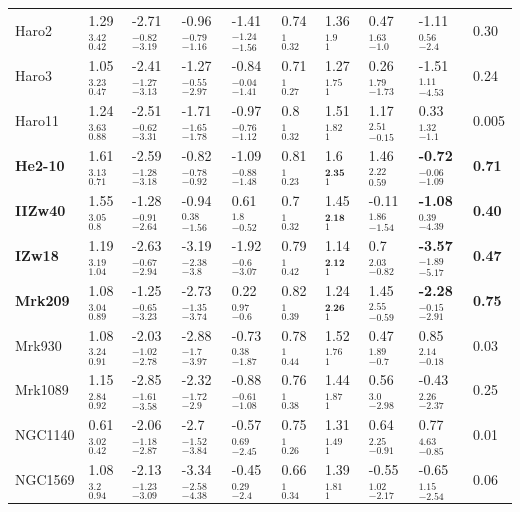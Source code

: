 \documentclass{aa}
\begin{document}
\begin{appendix}
\begin{table}[h!]
\begin{threeparttable}
\begin{tabular}{|p{}|p{}p{}p{}p{}|p{}p{}p{}p{}|p{}|}
\hline 
Haro2&1.29$_{0.42}^{3.42}$&-2.71$_{-3.19}^{-0.82}$&-0.96$_{-1.16}^{-0.79}$&-1.41$_{-1.56}^{-1.24}$&0.74$_{0.32}^{1}$&1.36$_{1}^{1.9}$&0.47$_{-1.0}^{1.63}$&-1.11$_{-2.4}^{0.56}$&0.30 \\
Haro3&1.05$_{0.47}^{3.23}$&-2.41$_{-3.13}^{-1.27}$&-1.27$_{-2.97}^{-0.55}$&-0.84$_{-1.41}^{-0.04}$&0.71$_{0.27}^{1}$&1.27$_{1}^{1.75}$&0.26$_{-1.73}^{1.79}$&-1.51$_{-4.53}^{1.11}$& 0.24\\
Haro11&1.24$_{0.88}^{3.63}$&-2.51$_{-3.31}^{-0.62}$&-1.71$_{-1.78}^{-1.65}$&-0.97$_{-1.12}^{-0.76}$&0.8$_{0.32}^{1}$&1.51$_{1}^{1.82}$&1.17$_{-0.15}^{2.51}$&0.33$_{-1.1}^{1.32}$&0.005\\
\textbf{He2-10}&1.61$_{0.71}^{3.13}$&-2.59$_{-3.18}^{-1.28}$&-0.82$_{-0.92}^{-0.78}$&-1.09$_{-1.48}^{-0.88}$&0.81$_{0.23}^{1}$&1.6$_{1}^{\textbf{2.35}}$&1.46$_{0.59}^{2.22}$&\textbf{-0.72}$_{-1.09}^{-0.06}$&\textbf{0.71}\\
\textbf{IIZw40}&1.55$_{0.8}^{3.05}$&-1.28$_{-2.64}^{-0.91}$&-0.94$_{-1.56}^{0.38}$&0.61$_{-0.52}^{1.8}$&0.7$_{0.32}^{1}$&1.45$_{1}^{\textbf{2.18}}$&-0.11$_{-1.54}^{1.86}$&\textbf{-1.08}$_{-4.39}^{0.39}$&\textbf{0.40}\\
\textbf{IZw18}&1.19$_{1.04}^{3.19}$&-2.63$_{-2.94}^{-0.67}$&-3.19$_{-3.8}^{-2.38}$&-1.92$_{-3.07}^{-0.6}$&0.79$_{0.42}^{1}$&1.14$_{1}^{\textbf{2.12}}$&0.7$_{-0.82}^{2.03}$&\textbf{-3.57}$_{-5.17}^{-1.89}$&\textbf{0.47}\\
\textbf{Mrk209}&1.08$_{0.89}^{3.04}$&-1.25$_{-3.23}^{-0.65}$&-2.73$_{-3.74}^{-1.35}$&0.22$_{-0.6}^{0.97}$&0.82$_{0.39}^{1}$&1.24$_{1}^{\textbf{2.26}}$&1.45$_{-0.59}^{2.55}$&\textbf{-2.28}$_{-2.91}^{-0.15}$&\textbf{0.75}\\
Mrk930&1.08$_{0.91}^{3.24}$&-2.03$_{-2.78}^{-1.02}$&-2.88$_{-3.97}^{-1.7}$&-0.73$_{-1.87}^{0.38}$&0.78$_{0.44}^{1}$&1.52$_{1}^{1.76}$&0.47$_{-0.7}^{1.89}$&0.85$_{-0.18}^{2.14}$&0.03\\
Mrk1089&1.15$_{0.92}^{2.84}$&-2.85$_{-3.58}^{-1.61}$&-2.32$_{-2.9}^{-1.72}$&-0.88$_{-1.08}^{-0.61}$&0.76$_{0.38}^{1}$&1.44$_{1}^{1.87}$&0.56$_{-2.98}^{3.0}$&-0.43$_{-2.37}^{2.26}$&0.25\\
NGC1140&0.61$_{0.42}^{3.02}$&-2.06$_{-2.87}^{-1.18}$&-2.7$_{-3.84}^{-1.52}$&-0.57$_{-2.45}^{0.69}$&0.75$_{0.26}^{1}$&1.31$_{1}^{1.49}$&0.64$_{-0.91}^{2.25}$&0.77$_{-0.85}^{4.63}$&0.01\\
NGC1569&1.08$_{0.94}^{3.2}$&-2.13$_{-3.09}^{-1.23}$&-3.34$_{-4.38}^{-2.58}$&-0.45$_{-2.4}^{0.29}$&0.66$_{0.34}^{1}$&1.39$_{1}^{1.81}$&-0.55$_{-2.17}^{1.02}$&-0.65$_{-2.54}^{1.15}$&0.06\\

\end{tabular}
\end{threeparttable}
\end{table}
\end{appendix}
\end{document}
